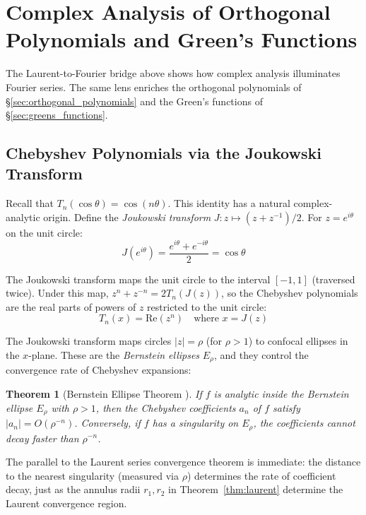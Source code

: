 \documentclass[12pt,a4paper]{report}
\theoremstyle{thms}
\newtheorem{theorem}{Theorem}[section]
\theoremstyle{defns}
\begin{document}
\section{Complex Analysis of Orthogonal Polynomials and Green's Functions}
\label{sec:complex_orthogonal}

The Laurent-to-Fourier bridge above shows how complex analysis illuminates Fourier series. The same lens enriches the orthogonal polynomials of \S\ref{sec:orthogonal_polynomials} and the Green's functions of \S\ref{sec:greens_functions}.

\subsection{Chebyshev Polynomials via the Joukowski Transform}

Recall that $T_n(\cos\theta) = \cos(n\theta)$. This identity has a natural complex-analytic origin. Define the \textit{Joukowski transform} $J: z \mapsto (z + z^{-1})/2$. For $z = e^{i\theta}$ on the unit circle:
\begin{equation}
    J(e^{i\theta}) = \dfrac{e^{i\theta} + e^{-i\theta}}{2} = \cos\theta
\end{equation}

The Joukowski transform maps the unit circle to the interval $[-1, 1]$ (traversed twice). Under this map, $z^n + z^{-n} = 2T_n(J(z))$, so the Chebyshev polynomials are the real parts of powers of $z$ restricted to the unit circle:
\begin{equation}
    T_n(x) = \mathrm{Re}(z^n) \quad \text{where } x = J(z)
\end{equation}

The Joukowski transform maps circles $|z| = \rho$ (for $\rho > 1$) to confocal ellipses in the $x$-plane. These are the \textit{Bernstein ellipses} $E_\rho$, and they control the convergence rate of Chebyshev expansions:

\begin{theorem}[Bernstein Ellipse Theorem \cite{trefethen_atap}]
    If $f$ is analytic inside the Bernstein ellipse $E_\rho$ with $\rho > 1$, then the Chebyshev coefficients $a_n$ of $f$ satisfy $|a_n| = O(\rho^{-n})$. Conversely, if $f$ has a singularity on $E_\rho$, the coefficients cannot decay faster than $\rho^{-n}$.
    \label{thm:bernstein_ellipse}
\end{theorem}

The parallel to the Laurent series convergence theorem is immediate: the distance to the nearest singularity (measured via $\rho$) determines the rate of coefficient decay, just as the annulus radii $r_1, r_2$ in Theorem~\ref{thm:laurent} determine the Laurent convergence region.
\end{document}
